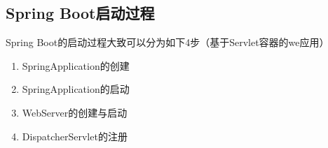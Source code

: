 \documentclass[../../../interview-questions.tex]{subfiles}
\begin{document}
\subsection{Spring Boot启动过程}

Spring Boot的启动过程大致可以分为如下4步（基于Servlet容器的we应用）

\begin{enumerate}
    \item {SpringApplication的创建}
    \item {SpringApplication的启动}
    \item {WebServer的创建与启动}
    \item {DispatcherServlet的注册}
\end{enumerate}
\end{document}

